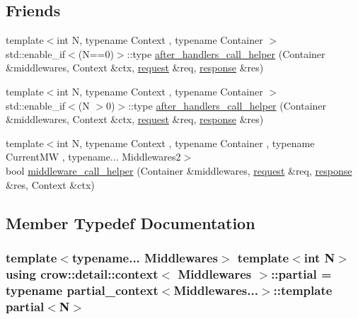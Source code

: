 \subsection*{Friends}
\begin{DoxyCompactItemize}
\item 
{\footnotesize template$<$int N, typename Context , typename Container $>$ }\\std\-::enable\-\_\-if$<$(N==0)$>$\-::type \hyperlink{structcrow_1_1detail_1_1context_a3d1ca546527852d0e74ba2a9f9d35a58}{after\-\_\-handlers\-\_\-call\-\_\-helper} (Container \&middlewares, Context \&ctx, \hyperlink{structcrow_1_1request}{request} \&req, \hyperlink{structcrow_1_1response}{response} \&res)
\item 
{\footnotesize template$<$int N, typename Context , typename Container $>$ }\\std\-::enable\-\_\-if$<$(N $>$0)$>$\-::type \hyperlink{structcrow_1_1detail_1_1context_a6ebdbe8f68d3d687f4935d14c68b576b}{after\-\_\-handlers\-\_\-call\-\_\-helper} (Container \&middlewares, Context \&ctx, \hyperlink{structcrow_1_1request}{request} \&req, \hyperlink{structcrow_1_1response}{response} \&res)
\item 
{\footnotesize template$<$int N, typename Context , typename Container , typename Current\-M\-W , typename... Middlewares2$>$ }\\bool \hyperlink{structcrow_1_1detail_1_1context_ac4a2d03a6f52cba172f8d6b7e0bf0230}{middleware\-\_\-call\-\_\-helper} (Container \&middlewares, \hyperlink{structcrow_1_1request}{request} \&req, \hyperlink{structcrow_1_1response}{response} \&res, Context \&ctx)
\end{DoxyCompactItemize}


\subsection{Member Typedef Documentation}
\hypertarget{structcrow_1_1detail_1_1context_aed24bba34e07bac2e533be71003ce1f1}{
\subsubsection[{partial}]{\setlength{\rightskip}{0pt plus 5cm}template$<$typename... Middlewares$>$ template$<$int N$>$ using {\bf crow\-::detail\-::context}$<$ Middlewares $>$\-::{\bf partial} =  typename {\bf partial\-\_\-context}$<$Middlewares...$>$\-::template {\bf partial}$<$N$>$}}\label{structcrow_1_1detail_1_1context_aed24bba34e07bac2e533be71003ce1f1}



